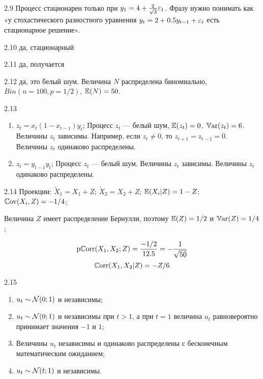 \protect \hypertarget {soln:2.9}{}
\begin{solution}{{2.9}}
Процесс стационарен только при $y_1=4+\frac{2}{\sqrt{3}}\varepsilon_1$. Фразу нужно понимать как «у стохастического разностного уравнения $y_t=2+0.5y_{t-1}+\varepsilon_t$ есть стационарное решение».
\end{solution}
\protect \hypertarget {soln:2.10}{}
\begin{solution}{{2.10}}
да, стационарный
\end{solution}
\protect \hypertarget {soln:2.11}{}
\begin{solution}{{2.11}}
да, получается
\end{solution}
\protect \hypertarget {soln:2.12}{}
\begin{solution}{{2.12}}
да, это белый шум. Величина $N$ распределена биномиально, $Bin(n=100,p=1/2)$, $\operatorname{\mathbb{E}}(N)=50$.
\end{solution}
\protect \hypertarget {soln:2.13}{}
\begin{solution}{{2.13}}

\begin{enumerate}
  \item $z_t = x_t (1-x_{t-1})y_t$;
    Процесс $z_t$ — белый шум, $\operatorname{\mathbb{E}}(z_t)=0$, $\operatorname{\mathbb{V}\mathrm{ar}}(z_t)=6$. Величины $z_t$ зависимы. Например, если $z_t \neq 0$, то $z_{t+1}=z_{t-1}=0$. Величины $z_t$ одинаково распределены.
\item $z_t = y_{t-1}y_t$;
Процесс $z_t$ — белый шум. Величины $z_t$ зависимы. Величины $z_t$ одинаково распределены.
\end{enumerate}


\end{solution}
\protect \hypertarget {soln:2.14}{}
\begin{solution}{{2.14}}
Проекции: $\tilde X_1 = X_1 + Z$; $\tilde X_2 = X_2 + Z$; $\operatorname{\mathbb{E}}(X_i|Z)=1-Z$; $\operatorname{\mathbb{C}\mathrm{ov}}(X_i, Z)=-1/4$;

Величина $Z$ имеет распределение Бернулли, поэтому $\operatorname{\mathbb{E}}(Z)=1/2$ и $\operatorname{\mathbb{V}\mathrm{ar}}(Z)=1/4$;

\[
  \operatorname{\mathrm{p}\mathbb{C}\mathrm{orr}}(X_1, X_2; Z) = \frac{-1/2}{12.5} = -\frac{1}{\sqrt{50}}
\]
\[
  \operatorname{\mathbb{C}\mathrm{orr}}(X_1, X_2|Z)=-Z/6
\]
  
\end{solution}
\protect \hypertarget {soln:2.15}{}
\begin{solution}{{2.15}}
\begin{enumerate}
  \item $u_t \sim \mathcal{N}(0;1)$ и независимы;
  \item $u_t \sim \mathcal{N}(0;1)$ и независимы при $t>1$, а при $t=1$ величина $u_t$ равновероятно
  принимает значения $-1$ и $1$;
  \item Величины $u_t$ независимы и одинаково распределены с бесконечным математическим ожиданием;
  \item $u_t \sim \mathcal{N}(t;1)$ и независимы.
\end{enumerate}
\end{solution}
